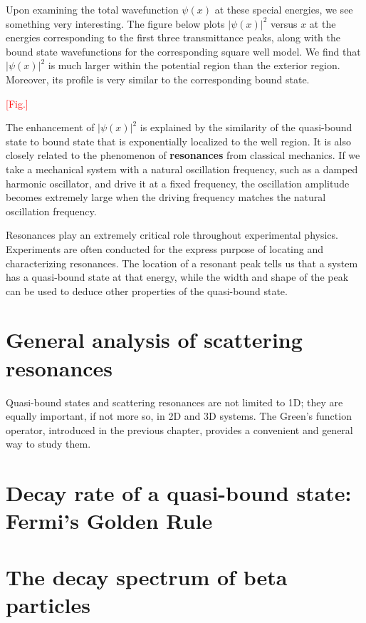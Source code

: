 \documentclass[pra,12pt]{revtex4}
\begin{document}
Upon examining the total wavefunction $\psi(x)$ at these special
energies, we see something very interesting.  The figure below plots
$|\psi(x)|^2$ versus $x$ at the energies corresponding to the first
three transmittance peaks, along with the bound state wavefunctions
for the corresponding square well model.  We find that $|\psi(x)|^2$
is much larger within the potential region than the exterior region.
Moreover, its profile is very similar to the corresponding bound
state.

\textcolor{red}{[Fig.]}

The enhancement of $|\psi(x)|^2$ is explained by the similarity of the
quasi-bound state to bound state that is exponentially localized to
the well region.  It is also closely related to the phenomenon of
\textbf{resonances} from classical mechanics.  If we take a mechanical
system with a natural oscillation frequency, such as a damped harmonic
oscillator, and drive it at a fixed frequency, the oscillation
amplitude becomes extremely large when the driving frequency matches
the natural oscillation frequency.

Resonances play an extremely critical role throughout experimental
physics.  Experiments are often conducted for the express purpose of
locating and characterizing resonances.  The location of a resonant
peak tells us that a system has a quasi-bound state at that energy,
while the width and shape of the peak can be used to deduce other
properties of the quasi-bound state.

\section{General analysis of scattering resonances}

Quasi-bound states and scattering resonances are not limited to 1D;
they are equally important, if not more so, in 2D and 3D systems.  The
Green's function operator, introduced in the previous chapter,
provides a convenient and general way to study them.



\section{Decay rate of a quasi-bound state: Fermi's Golden Rule}

\section{The decay spectrum of beta particles}
\end{document}
